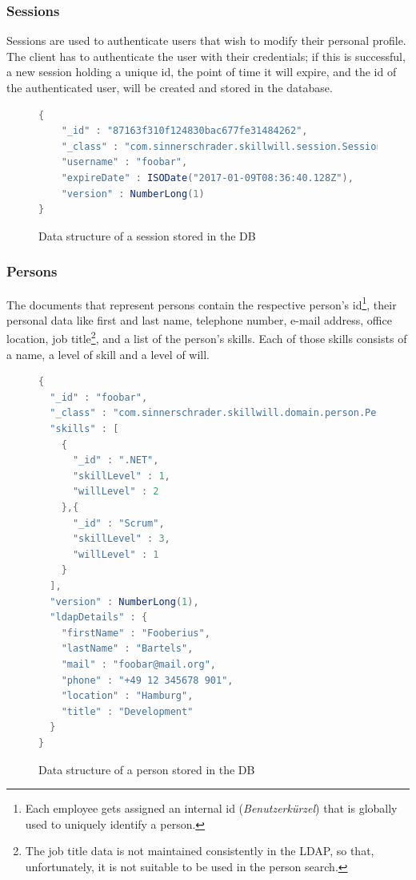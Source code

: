 \subsubsection{Sessions}
Sessions are used to authenticate users that wish to modify their personal profile. The client has to authenticate the user with their credentials; if this is successful, a new session holding a unique id, the point of time it will expire, and the id of the authenticated user, will be created and stored in the database.

\begin{figure}[h]
\begin{lstlisting}[language=Java]
{
	"_id" : "87163f310f124830bac677fe31484262",
	"_class" : "com.sinnerschrader.skillwill.session.Session",
	"username" : "foobar",
	"expireDate" : ISODate("2017-01-09T08:36:40.128Z"),
	"version" : NumberLong(1)
}
\end{lstlisting}
\caption[Session (DB Data Structure)]{Data structure of a session stored in the DB}
\end{figure}
\newpage

\subsubsection{Persons}
\label{db:person}
The documents that represent persons contain the respective person's id\footnote{Each employee gets assigned an internal id (\textit{Benutzerkürzel}) that is globally used to uniquely identify a person.}, their personal data like first and last name, telephone number, e-mail address, office location, job title\footnote{The job title data is not maintained consistently in the LDAP, so that, unfortunately, it is not suitable to be used in the person search.}, and a list of the person's skills. Each of those skills consists of a name, a level of skill and a level of will.
\begin{figure}[h]
\begin{lstlisting}[language=Java]
{
  "_id" : "foobar",
  "_class" : "com.sinnerschrader.skillwill.domain.person.Person",
  "skills" : [
    {
      "_id" : ".NET",
      "skillLevel" : 1,
      "willLevel" : 2
    },{
      "_id" : "Scrum",
      "skillLevel" : 3,
      "willLevel" : 1
    }
  ],
  "version" : NumberLong(1),
  "ldapDetails" : {
    "firstName" : "Fooberius",
    "lastName" : "Bartels",
    "mail" : "foobar@mail.org",
    "phone" : "+49 12 345678 901",
    "location" : "Hamburg",
    "title" : "Development"
  }
}
\end{lstlisting}
\caption[Person (DB Data Structure)]{Data structure of a person stored in the DB}
\end{figure}

